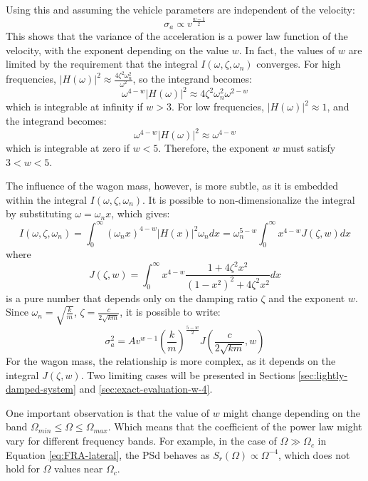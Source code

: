 Using this and assuming the vehicle parameters are independent of the velocity:
\begin{equation}
    \sigma_a \propto v^{\frac{w-1}{2}}
\end{equation}
This shows that the variance of the acceleration is a power law function of the velocity, with the exponent depending on the value $w$. In fact, the values of $w$ are limited by the requirement that the integral $I(\omega, \zeta, \omega_n)$ converges. For high frequencies, $|H(\omega)|^2 \approx \frac{4\zeta^2 \omega_n^2}{\omega^2}$, so the integrand becomes:
\begin{equation}
    \omega^{4-w} |H(\omega)|^2 \approx 4\zeta^2 \omega_n^2 \omega^{2-w}
\end{equation}
which is integrable at infinity if $w > 3$. For low frequencies, $|H(\omega)|^2 \approx 1$, and the integrand becomes:
\begin{equation}
    \omega^{4-w} |H(\omega)|^2 \approx \omega^{4-w}
\end{equation}
which is integrable at zero if $w < 5$. Therefore, the exponent $w$ must satisfy $3 < w < 5$.

The influence of the wagon mass, however, is more subtle, as it is embedded within the integral $I(\omega, \zeta, \omega_n)$. It is possible to non-dimensionalize the integral by substituting $\omega = \omega_n x$, which gives:
\begin{equation}
    I(\omega, \zeta, \omega_n) = \int_{0}^{\infty} (\omega_n x)^{4-w} |H(x)|^2 \omega_n dx  = \omega_n^{5-w} \int_{0}^{\infty} x^{4-w} J(\zeta, w) dx
\end{equation}
where
\begin{equation}
    J(\zeta, w) = \int_{0}^{\infty} x^{4-w} \frac{1 + 4 \zeta^2 x^2}{(1 - x^2)^2 + 4 \zeta^2 x^2} dx
\end{equation}
is a pure number that depends only on the damping ratio $\zeta$ and the exponent $w$. Since $\omega_n = \sqrt{\frac{k}{m}}$, $\zeta = \frac{c}{2\sqrt{km}}$, it is possible to write:
\begin{equation}
    \sigma^2_{a} = A v^{w-1} \left(\frac{k}{m}\right)^{\frac{5-w}{2}} J\left(\frac{c}{2\sqrt{km}}, w\right)
\end{equation}
For the wagon mass, the relationship is more complex, as it depends on the integral $J(\zeta, w)$. Two limiting cases will be presented in Sections \ref{sec:lightly-damped-system} and \ref{sec:exact-evaluation-w-4}.

One important observation is that the value of $w$ might change depending on the band $\Omega_{min} \leq \Omega \leq \Omega_{max}$. Which means that the coefficient of the power law might vary for different frequency bands. For example, in the case of $\Omega \gg \Omega_c$ in Equation \ref{eq:FRA-lateral}, the PSd behaves as $S_r(\Omega) \propto \Omega^{-4}$, which does not hold for $\Omega$ values near $\Omega_c$.

